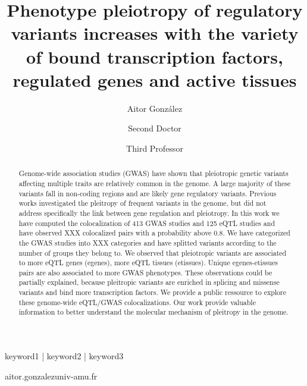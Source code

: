 
\title{Phenotype pleiotropy of regulatory variants increases with the variety of bound transcription factors, regulated genes and active tissues}

\author[1,\Letter]{Aitor González }
\author[2]{Second Doctor }
\author[1]{Third Professor }
\date{}

\maketitle

\begin{abstract}

Genome-wide association studies (GWAS) have shown that pleiotropic genetic variants affecting multiple traits are relatively common in the genome.
A large majority of these variants fall in non-coding regions and are likely gene regulatory variants.
Previous works investigated the pleitropy of frequent variants in the genome, but did not address specifically the link between gene regulation and pleiotropy.
%
In this work we have computed the colocalization of 413 GWAS studies and 125 eQTL studies and have observed XXX colocalized pairs with a probability above 0.8.
We have categorized the GWAS studies into XXX categories and have splitted variants according to the number of groups they belong to.
We observed that pleiotropic variants are associated to more eQTL genes (egenes), more eQTL tissues (etissues).
Unique egenes-etissues pairs are also associated to more GWAS phenotypes.
These observations could be partially explained, because pleitropic variants are enriched in splicing and missense variants and bind more transcription factors.
We provide a public ressource to explore these genome-wide eQTL/GWAS colocalizations.
%
Our work provide valuable information to better understand the molecular mechanism of pleitropy in the genome.


\lipsum[1][1]
\end{abstract}

\begin{keywords}
keyword1 | keyword2 | keyword3
\end{keywords}

\begin{corrauthor}
aitor.gonzalez\at univ-amu.fr
\end{corrauthor}

